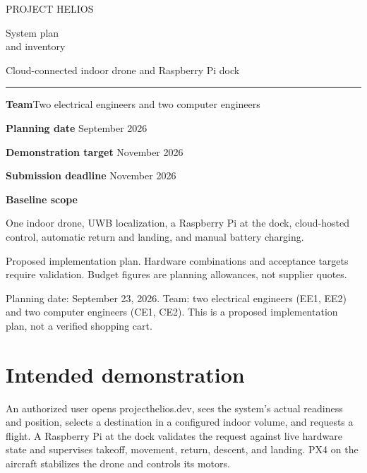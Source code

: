 \documentclass[10pt,letterpaper]{article}
\begin{document}
\hypersetup{pageanchor=false}\begin{titlepage}
\vspace*{1.1in}
{\sffamily\color{accent}\Large PROJECT HELIOS\par}
\vspace{0.3in}
{\sffamily\color{ink}\fontsize{32}{37}\selectfont System plan\\and inventory\par}
\vspace{0.3in}
{\Large Cloud-connected indoor drone and Raspberry Pi dock\par}
\vspace{0.5in}
\rule{\textwidth}{0.8pt}
\vspace{0.15in}
\textbf{Team}\quad Two electrical engineers and two computer engineers\par
\textbf{Planning date} September 2026\par
\textbf{Demonstration target} November 2026\par
\textbf{Submission deadline} November 2026\par
\vspace{0.35in}
\colorbox{pale}{\parbox{\dimexpr\textwidth-2\fboxsep}{\vspace{9pt}\textbf{Baseline scope}\par One indoor drone, UWB localization, a Raspberry Pi at the dock, cloud-hosted control, automatic return and landing, and manual battery charging.\vspace{9pt}}}
\vfill
{\small Proposed implementation plan. Hardware combinations and acceptance targets require validation. Budget figures are planning allowances, not supplier quotes.\par}
\end{titlepage}
\hypersetup{pageanchor=true}
\tableofcontents
\newpage
{}
Planning date: September 23, 2026. Team: two electrical engineers (EE1, EE2) and two computer engineers (CE1, CE2). This is a proposed implementation plan, not a verified shopping cart.

\section{Intended demonstration}
An authorized user opens projecthelios.dev, sees the system's actual readiness and position, selects a destination in a configured indoor volume, and requests a flight. A Raspberry Pi at the dock validates the request against live hardware state and supervises takeoff, movement, return, descent, and landing. PX4 on the aircraft stabilizes the drone and controls its motors.
\end{document}
